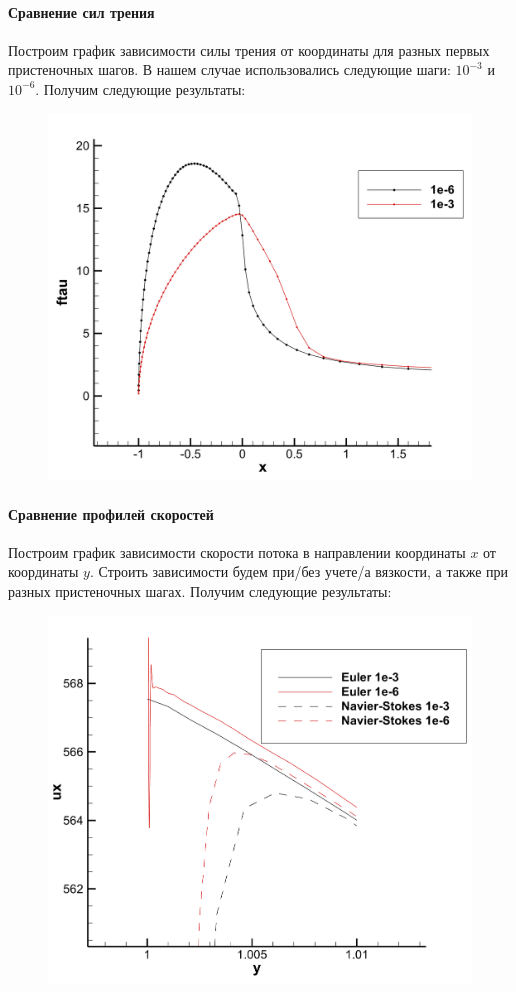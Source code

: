 \documentclass[12pt,a4paper, titlepage]{article}
\begin{document}
\paragraph{Сравнение сил трения}
Построим график зависимости силы трения от координаты для разных первых пристеночных шагов. В нашем случае использовались следующие шаги: $10^{-3}$ и $10^{-6}$. Получим следующие результаты:
\begin{figure}[H]
	\centering
	\includegraphics[width = 1.0\textwidth]{ans_1.png}
\end{figure}

\paragraph{Сравнение профилей скоростей}
Построим график зависимости скорости потока в направлении координаты $x$ от координаты $y$. Строить зависимости будем при/без учете/а вязкости, а также при разных пристеночных шагах. Получим следующие результаты:
\begin{figure}[H]
	\centering
	\includegraphics[width = 1.0\textwidth]{ans_2.png}
\end{figure}
\end{document}

